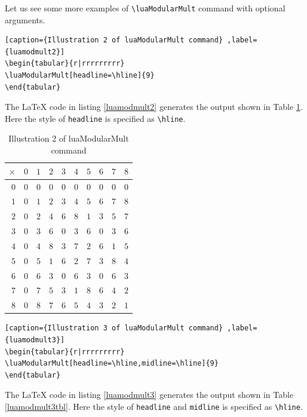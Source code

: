 ﻿\documentclass{article}
\begin{document}
Let us see some more examples of \verb|\luaModularMult| command with optional arguments.
\begin{lstlisting}[caption={Illustration 2 of luaModularMult command} ,label={luamodmult2}]
\begin{tabular}{r|rrrrrrrrr}
\luaModularMult[headline=\hline]{9}
\end{tabular}
\end{lstlisting}
The LaTeX code in listing \ref{luamodmult2} generates the output shown in Table  \ref{luamodmult2tbl}. Here the style of \verb|headline| is specified as \verb|\hline|.

\begin{table}[H]
\centering
\begin{tabular}{r|rrrrrrrrr}
$\times$ & $0$ & $1$ & $2$ & $3$ & $4$ & $5$ & $6$ & $7$ & $8$\\ \hline$0$ & $0$ & $0$ & $0$ & $0$ & $0$ & $0$ & $0$ & $0$ & $0$\\ $1$ & $0$ & $1$ & $2$ & $3$ & $4$ & $5$ & $6$ & $7$ & $8$\\ $2$ & $0$ & $2$ & $4$ & $6$ & $8$ & $1$ & $3$ & $5$ & $7$\\ $3$ & $0$ & $3$ & $6$ & $0$ & $3$ & $6$ & $0$ & $3$ & $6$\\ $4$ & $0$ & $4$ & $8$ & $3$ & $7$ & $2$ & $6$ & $1$ & $5$\\ $5$ & $0$ & $5$ & $1$ & $6$ & $2$ & $7$ & $3$ & $8$ & $4$\\ $6$ & $0$ & $6$ & $3$ & $0$ & $6$ & $3$ & $0$ & $6$ & $3$\\ $7$ & $0$ & $7$ & $5$ & $3$ & $1$ & $8$ & $6$ & $4$ & $2$\\ $8$ & $0$ & $8$ & $7$ & $6$ & $5$ & $4$ & $3$ & $2$ & $1$
\end{tabular}
\caption{Illustration 2 of  luaModularMult command}
\label{luamodmult2tbl}
\end{table}

\begin{lstlisting}[caption={Illustration 3 of luaModularMult command} ,label={luamodmult3}]
\begin{tabular}{r|rrrrrrrrr}
\luaModularMult[headline=\hline,midline=\hline]{9}
\end{tabular}
\end{lstlisting}
The LaTeX code in listing \ref{luamodmult3} generates the output shown in Table  \ref{luamodmult3tbl}. Here the style of \verb|headline| and \verb|midline| is specified as \verb|\hline|.
\end{document}
